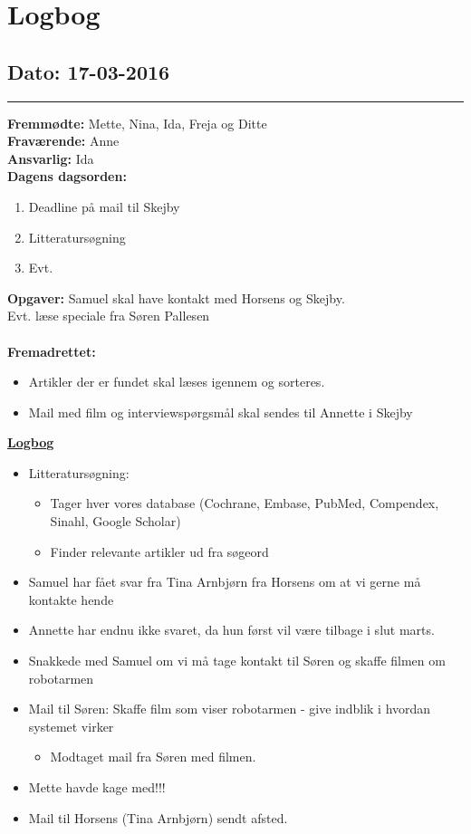 \chapter{Logbog}
\section{Dato: 17-03-2016}
\hrule
\textbf{Fremmødte:} Mette, Nina, Ida, Freja og Ditte \\
\textbf{Fraværende:} Anne \\
\textbf{Ansvarlig:} Ida \\
\textbf{Dagens dagsorden: }
\begin{enumerate}
	\item Deadline på mail til Skejby 
	\item Litteratursøgning 
	\item Evt.
\end{enumerate}

\textbf{Opgaver:} \newline
Samuel skal have kontakt med Horsens og Skejby.\\
Evt. læse speciale fra Søren Pallesen\\
\\
\textbf{Fremadrettet: }
\begin{itemize}
\item Artikler der er fundet skal læses igennem og sorteres.
\item Mail med film og interviewspørgsmål skal sendes til Annette i Skejby
\end{itemize}

\underline{\textbf{Logbog}}
\begin{itemize}
\item Litteratursøgning:
\begin{itemize}
\item Tager hver vores database (Cochrane, Embase, PubMed, Compendex, Sinahl, Google Scholar)
\item Finder relevante artikler ud fra søgeord
\end{itemize}
\item Samuel har fået svar fra Tina Arnbjørn fra Horsens om at vi gerne må kontakte hende
\item Annette har endnu ikke svaret, da hun først vil være tilbage i slut marts.
\item Snakkede med Samuel om vi må tage kontakt til Søren og skaffe filmen om robotarmen
\item Mail til Søren: Skaffe film som viser robotarmen - give indblik i hvordan systemet virker
\begin{itemize}
\item Modtaget mail fra Søren med filmen.
\end{itemize}
\item Mette havde kage med!!!
\item Mail til Horsens (Tina Arnbjørn) sendt afsted. 
\end{itemize}

\newpage